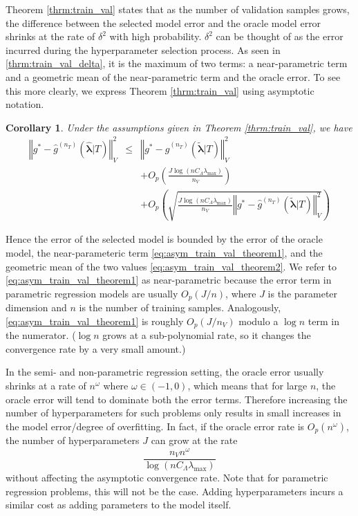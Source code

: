 \documentclass[12pt]{article}
\newtheorem{corollary}{Corollary}
\begin{document}
Theorem \ref{thrm:train_val} states that as the number of validation samples grows, the difference between the selected model error and the oracle model error shrinks at the rate of $\delta^2$ with high probability. $\delta^2$ can be thought of as the error incurred during the hyperparameter selection process. As seen in \eqref{thrm:train_val_delta}, it is the maximum of two terms: a near-parametric term and a geometric mean of the near-parametric term and the oracle error. To see this more clearly, we express Theorem \ref{thrm:train_val} using asymptotic notation.
\begin{corollary}
	\label{corr:train_val}
	Under the assumptions given in Theorem \ref{thrm:train_val}, we have
	\begin{eqnarray}
	\left\Vert g^* - \hat{g}^{(n_T)}( \hat{\boldsymbol{\lambda}} | T) \right\Vert _{V}^2 &\le& \left\Vert g^* - \hat{g}^{(n_T)}( \tilde{\boldsymbol{\lambda}} | T) \right \Vert^2_{V}\\
	&& + O_p \left(\frac{J\log (n C_\Lambda\lambda_{\max})}{n_{V}} \right) 
	\label{eq:asym_train_val_theorem1} \\
	&& + O_p \left(
	\sqrt{
		\frac{J \log (n C_\Lambda\lambda_{\max})}{n_{V}}
		\left\Vert g^* - \hat{g}^{(n_T)}( \tilde{\boldsymbol{\lambda}}| T) \right \Vert^2_{V}
	}
	\right )
	\label{eq:asym_train_val_theorem2}
	\end{eqnarray}
\end{corollary}
Hence the error of the selected model is bounded by the error of the oracle model, the near-parameteric term \eqref{eq:asym_train_val_theorem1}, and the geometric mean of the two values \eqref{eq:asym_train_val_theorem2}. We refer to \eqref{eq:asym_train_val_theorem1} as near-parametric because the error term in parametric regression models are usually $O_p(J/n)$, where $J$ is the parameter dimension and $n$ is the number of training samples. Analogously, \eqref{eq:asym_train_val_theorem1} is roughly $O_p(J/n_V)$ modulo a $\log n$ term in the numerator. ($\log n$ grows at a sub-polynomial rate, so it changes the convergence rate by a very small amount.)

In the semi- and non-parametric regression setting, the oracle error usually shrinks at a rate of $n^\omega$ where $\omega \in (-1, 0)$, which means that for large $n$, the oracle error will tend to dominate both the error terms. Therefore increasing the number of hyperparameters for such problems only results in small increases in the model error/degree of overfitting. In fact, if the oracle error rate is $O_p(n^\omega)$, the number of hyperparameters $J$ can grow at the rate
\begin{equation}
\frac{n_{V} n^\omega }{\log (n C_\Lambda\lambda_{\max})}
\end{equation}
without affecting the asymptotic convergence rate. Note that for parametric regression problems, this will not be the case. Adding hyperparameters incurs a similar cost as adding parameters to the model itself.
\end{document}
